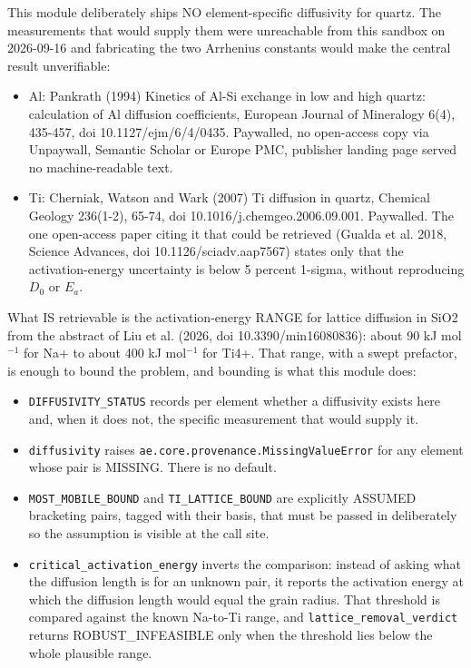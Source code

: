 \documentclass[10pt,a4paper,twoside]{report}
\begin{document}
This module deliberately ships NO element-specific diffusivity for quartz. The measurements that would supply them were unreachable from this sandbox on 2026-09-16 and fabricating the two Arrhenius constants would make the central result unverifiable:

\begin{itemize}
\item Al: Pankrath (1994) Kinetics of Al-Si exchange in low and high quartz: calculation of Al diffusion coefficients, European Journal of Mineralogy 6(4), 435-457, doi 10.1127/ejm/6/4/0435. Paywalled, no open-access copy via Unpaywall, Semantic Scholar or Europe PMC, publisher landing page served no machine-readable text.
\item Ti: Cherniak, Watson and Wark (2007) Ti diffusion in quartz, Chemical Geology 236(1-2), 65-74, doi 10.1016/j.chemgeo.2006.09.001. Paywalled. The one open-access paper citing it that could be retrieved (Gualda et al. 2018, Science Advances, doi 10.1126/sciadv.aap7567) states only that the activation-energy uncertainty is below 5 percent 1-sigma, without reproducing $D_0$ or $E_a$.
\end{itemize}

What IS retrievable is the activation-energy RANGE for lattice diffusion in SiO2 from the abstract of Liu et al. (2026, doi 10.3390/min16080836): about 90 kJ mol$^{-1}$ for Na+ to about 400 kJ mol$^{-1}$ for Ti4+. That range, with a swept prefactor, is enough to bound the problem, and bounding is what this module does:

\begin{itemize}
\item \texttt{DIFFUSIVITY\_STATUS} records per element whether a diffusivity exists here and, when it does not, the specific measurement that would supply it.
\item \texttt{diffusivity} raises \texttt{ae.core.provenance.MissingValueError} for any element whose pair is MISSING. There is no default.
\item \texttt{MOST\_MOBILE\_BOUND} and \texttt{TI\_LATTICE\_BOUND} are explicitly ASSUMED bracketing pairs, tagged with their basis, that must be passed in deliberately so the assumption is visible at the call site.
\item \texttt{critical\_activation\_energy} inverts the comparison: instead of asking what the diffusion length is for an unknown pair, it reports the activation energy at which the diffusion length would equal the grain radius. That threshold is compared against the known Na-to-Ti range, and \texttt{lattice\_removal\_verdict} returns ROBUST\_INFEASIBLE only when the threshold lies below the whole plausible range.
\end{itemize}
\end{document}
